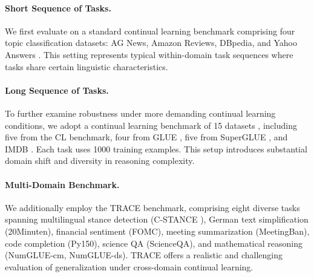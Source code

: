 \documentclass[letterpaper]{article} %
\begin{document}
\paragraph{Short Sequence of Tasks.}
We first evaluate on a standard continual learning benchmark comprising four topic classification datasets: AG News, Amazon Reviews, DBpedia, and Yahoo Answers . This setting represents typical within-domain task sequences where tasks share certain linguistic characteristics.

\paragraph{Long Sequence of Tasks.}
To further examine robustness under more demanding continual learning conditions, we adopt a continual learning benchmark of 15 datasets , including five from the CL benchmark, four from GLUE , five from SuperGLUE , and IMDB . Each task uses 1000 training examples. This setup introduces substantial domain shift and diversity in reasoning complexity.

\paragraph{Multi-Domain Benchmark.}
We additionally employ the TRACE benchmark, comprising eight diverse tasks spanning multilingual stance detection (C-STANCE ), German text simplification (20Minuten), financial sentiment (FOMC), meeting summarization (MeetingBan), code completion (Py150), science QA (ScienceQA), and mathematical reasoning (NumGLUE-cm, NumGLUE-ds). TRACE offers a realistic and challenging evaluation of generalization under cross-domain continual learning.


\end{document}
